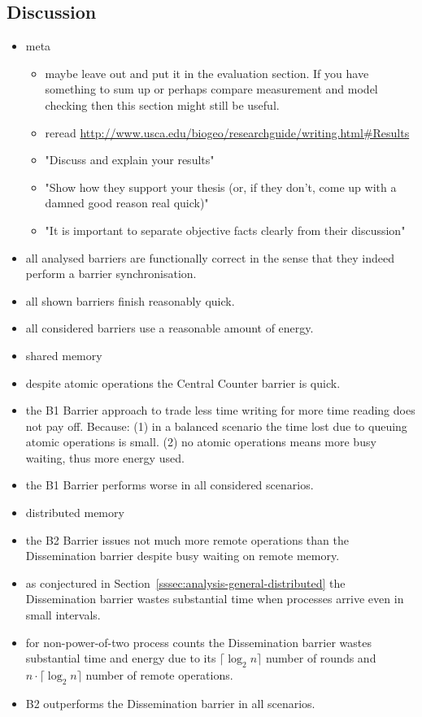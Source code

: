 \documentclass[a4paper, 10pt]{article}
\begin{document}
\subsection{Discussion}
\label{ssec:analysis-discussion}
\begin{itemize}
	\item meta
		\begin{itemize}
			\item maybe leave out and put it in the evaluation section. If you have something to sum up or perhaps compare measurement and model checking then this section might still be useful.
			\item reread \url{http://www.usca.edu/biogeo/researchguide/writing.html#Results}
			\item "Discuss and explain your results"
			\item "Show how they support your thesis (or, if they don't, come up with a damned good reason real quick)"
			\item "It is important to separate objective facts clearly from their discussion"
		\end{itemize}

	\item all analysed barriers are functionally correct in the sense that they indeed perform a barrier synchronisation.
	\item all shown barriers finish reasonably quick.
	\item all considered barriers use a reasonable amount of energy.

	\item shared memory
	\item despite atomic operations the Central Counter barrier is quick.
	\item the B1 Barrier approach to trade less time writing for more time reading does not pay off. Because: (1) in a balanced scenario the time lost due to queuing atomic operations is small. (2) no atomic operations means more busy waiting, thus more energy used.
	\item the B1 Barrier performs worse in all considered scenarios.

	\item distributed memory
	\item the B2 Barrier issues not much more remote operations than the Dissemination barrier despite busy waiting on remote memory.
	\item as conjectured in Section~\ref{sssec:analysis-general-distributed} the Dissemination barrier wastes substantial time when processes arrive even in small intervals.
	\item for non-power-of-two process counts the Dissemination barrier wastes substantial time and energy due to its $\lceil \log_2 n \rceil$ number of rounds and $n \cdot \lceil \log_2 n \rceil$ number of remote operations.
	\item B2 outperforms the Dissemination barrier in all scenarios.


\end{itemize}
\end{document}
